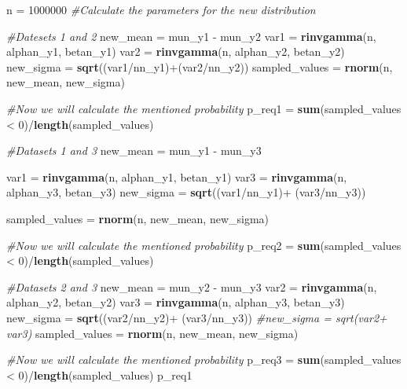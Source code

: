 \documentclass[]{article}
\newenvironment{Shaded}{\begin{snugshade}}{\end{snugshade}}
\newcommand{\KeywordTok}[1]{\textcolor[rgb]{0.13,0.29,0.53}{\textbf{{#1}}}}
\newcommand{\DecValTok}[1]{\textcolor[rgb]{0.00,0.00,0.81}{{#1}}}
\newcommand{\StringTok}[1]{\textcolor[rgb]{0.31,0.60,0.02}{{#1}}}
\newcommand{\CommentTok}[1]{\textcolor[rgb]{0.56,0.35,0.01}{\textit{{#1}}}}
\newcommand{\NormalTok}[1]{{#1}}
\begin{document}
\begin{Shaded}
\begin{Highlighting}[]
\NormalTok{n =}\StringTok{ }\DecValTok{1000000}
\CommentTok{#Calculate the parameters for the new distribution}

\CommentTok{#Datesets 1 and 2}
\NormalTok{new_mean =}\StringTok{ }\NormalTok{mun_y1 -}\StringTok{ }\NormalTok{mun_y2}
\NormalTok{var1 =}\StringTok{ }\KeywordTok{rinvgamma}\NormalTok{(n, alphan_y1, betan_y1)}
\NormalTok{var2 =}\StringTok{ }\KeywordTok{rinvgamma}\NormalTok{(n, alphan_y2, betan_y2)}
\NormalTok{new_sigma =}\StringTok{ }\KeywordTok{sqrt}\NormalTok{((var1/nn_y1)+(var2/nn_y2))}
\NormalTok{sampled_values =}\StringTok{ }\KeywordTok{rnorm}\NormalTok{(n, new_mean, new_sigma)}

\CommentTok{#Now we will calculate the mentioned probability}
\NormalTok{p_req1 =}\StringTok{ }\KeywordTok{sum}\NormalTok{(sampled_values <}\StringTok{ }\DecValTok{0}\NormalTok{)/}\KeywordTok{length}\NormalTok{(sampled_values)}

\CommentTok{#Datasets 1 and 3}
\NormalTok{new_mean =}\StringTok{ }\NormalTok{mun_y1 -}\StringTok{ }\NormalTok{mun_y3}

\NormalTok{var1 =}\StringTok{ }\KeywordTok{rinvgamma}\NormalTok{(n, alphan_y1, betan_y1)}
\NormalTok{var3 =}\StringTok{ }\KeywordTok{rinvgamma}\NormalTok{(n, alphan_y3, betan_y3)}
\NormalTok{new_sigma =}\StringTok{ }\KeywordTok{sqrt}\NormalTok{((var1/nn_y1)+}\StringTok{ }\NormalTok{(var3/nn_y3))}

\NormalTok{sampled_values =}\StringTok{ }\KeywordTok{rnorm}\NormalTok{(n, new_mean, new_sigma)}

\CommentTok{#Now we will calculate the mentioned probability}
\NormalTok{p_req2 =}\StringTok{ }\KeywordTok{sum}\NormalTok{(sampled_values <}\StringTok{ }\DecValTok{0}\NormalTok{)/}\KeywordTok{length}\NormalTok{(sampled_values)}

\CommentTok{#Datasets 2 and 3}
\NormalTok{new_mean =}\StringTok{ }\NormalTok{mun_y2 -}\StringTok{ }\NormalTok{mun_y3}
\NormalTok{var2 =}\StringTok{ }\KeywordTok{rinvgamma}\NormalTok{(n, alphan_y2, betan_y2)}
\NormalTok{var3 =}\StringTok{ }\KeywordTok{rinvgamma}\NormalTok{(n, alphan_y3, betan_y3)}
\NormalTok{new_sigma =}\StringTok{ }\KeywordTok{sqrt}\NormalTok{((var2/nn_y2)+}\StringTok{ }\NormalTok{(var3/nn_y3))}
\CommentTok{#new_sigma = sqrt(var2+ var3)}
\NormalTok{sampled_values =}\StringTok{ }\KeywordTok{rnorm}\NormalTok{(n, new_mean, new_sigma)}

\CommentTok{#Now we will calculate the mentioned probability}
\NormalTok{p_req3 =}\StringTok{ }\KeywordTok{sum}\NormalTok{(sampled_values <}\StringTok{ }\DecValTok{0}\NormalTok{)/}\KeywordTok{length}\NormalTok{(sampled_values)}
\NormalTok{p_req1}
\end{Highlighting}
\end{Shaded}
\end{document}
